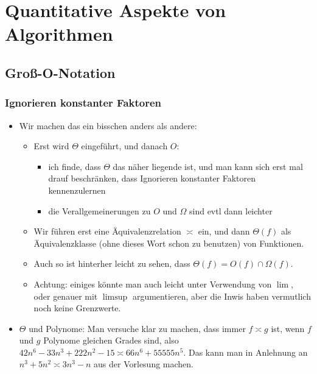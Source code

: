 \documentclass[12pt]{article}
\theoremstyle{margin}
\theoremstyle{margin}
\begin{document}


\setcounter{section}{8}

\section{Quantitative Aspekte von Algorithmen}

\subsection{Gro\ss-O-Notation}
\subsubsection{Ignorieren konstanter Faktoren}

\begin{itemize}
 \item   Wir machen das ein bisschen anders als andere:
  \begin{itemize}
  \item Erst wird $\Theta$ eingef\"uhrt, und danach $O$:
    \begin{itemize}
    \item ich finde, dass $\Theta$ das n\"aher liegende ist, und man
      kann sich erst mal drauf beschr\"anken, dass Ignorieren konstanter
      Faktoren kennenzulernen
    \item die Verallgemeinerungen zu $O$ und $\Omega$ sind evtl dann
      leichter
    \end{itemize}
  \item Wir f\"uhren erst eine \"Aquivalenzrelation $\asymp$ ein, und dann
    $\Theta(f)$ als \"Aquivalenzklasse (ohne dieses Wort schon zu
    benutzen) von Funktionen.
  \item Auch so ist hinterher leicht zu sehen, dass $\Theta(f)=O(f)\cap
    \Omega(f)$.
  \item Achtung: einiges k\"onnte man auch leicht unter Verwendung von
    $\lim$, oder genauer mit $\limsup$ argumentieren, aber die Inwis
    haben vermutlich noch keine Grenzwerte.
  \end{itemize}

\item
  $\Theta$ und Polynome: Man versuche klar zu machen, dass immer
  $f\asymp g$ ist, wenn $f$ und $g$ Polynome gleichen Grades sind,
  also \zB $42n^6-33n^3+222n^2 -15 \asymp 66n^6+55555n^5$. Das kann
  man \zB in Anlehnung an $n^3+5n^2\asymp 3n^3-n$ aus der Vorlesung
  machen.


\end{itemize}
\end{document}
